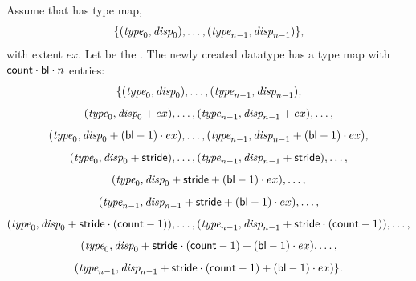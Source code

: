 Assume that  has type map,
\begin{displaymath}
\{ (\textrm{\itshape{type}}_0,\textrm{\itshape{disp}}_0), \ldots, (\textrm{\itshape{type}}_{n-1}, \textrm{\itshape{disp}}_{n-1}) \} ,
\end{displaymath}
with extent $ex$.  Let  be the .
The newly created  datatype has a type map with
$\textsf{count} \cdot \textsf{bl} \cdot n$
entries:
\begin{displaymath}
\{
(\textrm{\itshape{type}}_0, \textrm{\itshape{disp}}_0), \ldots , (\textrm{\itshape{type}}_{n-1} , \textrm{\itshape{disp}}_{n-1}),
\end{displaymath}
\begin{displaymath}
(\textrm{\itshape{type}}_0 ,\textrm{\itshape{disp}}_0 + ex) , \ldots ,
(\textrm{\itshape{type}}_{n-1} , \textrm{\itshape{disp}}_{n-1} + ex ), \ldots,
\end{displaymath}
\begin{displaymath}
(\textrm{\itshape{type}}_0 , \textrm{\itshape{disp}}_0 + (\textsf{bl} -1) \cdot ex
) , \ldots , (\textrm{\itshape{type}}_{n-1} , \textrm{\itshape{disp}}_{n-1} + (\textsf{bl} -1) \cdot ex ) ,
\end{displaymath}
\begin{displaymath}
(\textrm{\itshape{type}}_0 ,\textrm{\itshape{disp}}_0 + \textsf{stride}  ) , \ldots ,
(\textrm{\itshape{type}}_{n-1} , \textrm{\itshape{disp}}_{n-1} + \textsf{stride} ) , \ldots ,
\end{displaymath}
\begin{displaymath}
(\textrm{\itshape{type}}_0 , \textrm{\itshape{disp}}_0 + \textsf{stride} + ( \textsf{bl} -1) \cdot ex
) , \ldots ,
\end{displaymath}
\begin{displaymath}
(\textrm{\itshape{type}}_{n-1}, \textrm{\itshape{disp}}_{n-1} + \textsf{stride} + (\textsf{bl} -1) \cdot
ex ) ,
\ldots ,
\end{displaymath}
\begin{displaymath}
(\textrm{\itshape{type}}_0 ,\textrm{\itshape{disp}}_0 + \textsf{stride} \cdot (\textsf{count}-1) ) , \ldots ,
(\textrm{\itshape{type}}_{n-1} , \textrm{\itshape{disp}}_{n-1} + \textsf{stride} \cdot (\textsf{count} -1)  )
, \ldots ,
\end{displaymath}
\begin{displaymath}
(\textrm{\itshape{type}}_0 , \textrm{\itshape{disp}}_0 + \textsf{stride} \cdot (\textsf{count} -1)
+ (\textsf{bl} -1) \cdot ex ) , \ldots ,
\end{displaymath}
\begin{displaymath}
(\textrm{\itshape{type}}_{n-1}, \textrm{\itshape{disp}}_{n-1} + \textsf{stride} \cdot (\textsf{count} -1)
+ (\textsf{bl} -1) \cdot ex )
\} .
\end{displaymath}

